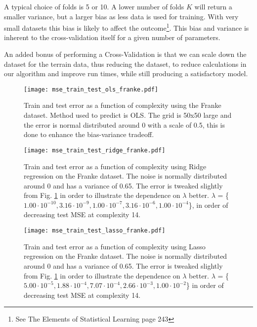 \documentclass[%
 reprint,
nofootinbib,
 amsmath,amssymb,
 aps,
]{revtex4-2}
\begin{document}
A typical choice of folds is 5 or 10. A lower number of folds $K$ will return a smaller variance, but a larger bias as less data is used for training. With very small datasets this bias is likely to affect the outcome\footnote{See The Elements of Statistical Learning\cite{Hastie} page 243}. This bias and variance is inherent to the cross-validation itself for a given number of parameters.

An added bonus of performing a Cross-Validation is that we can scale down the
dataset for the terrain data, thus reducing the dataset, to reduce calculations
in our algorithm and improve run times, while still producing a satisfactory model.

\begin{figure}[b]
\texttt{[image: mse\_train\_test\_ols\_franke.pdf]}
\caption{\label{fig:mse_train_test_ols_franke_eps05} Train and test error as a function of complexity using the Franke dataset. Method used to predict is OLS. The grid is 50x50 large and the error is normal distributed around 0 with a scale of 0.5, this is done to enhance the bias-variance tradeoff.}
\end{figure}

\begin{figure}[h!]
\texttt{[image: mse\_train\_test\_ridge\_franke.pdf]}
\caption{\label{fig:mse_train_test_ridge_franke_eps065} Train and test error as a function of complexity using Ridge regression on the Franke dataset. The noise is normally distributed around 0 and has a variance of 0.65. The error is tweaked slightly from Fig. \ref{fig:mse_train_test_ols_franke_eps05} in order to illustrate the dependence on $\lambda$ better. $\lambda$ = \{$1.00 \cdot 10^{-10}, 3.16 \cdot 10^{-9}, 1.00 \cdot 10^{-7}, 3.16 \cdot 10^{-6}, 1.00 \cdot 10^{-4} $\}, in order of decreasing test MSE at complexity 14.}
\end{figure}

\begin{figure}[h!]
\texttt{[image: mse\_train\_test\_lasso\_franke.pdf]}
\caption{\label{fig:mse_train_test_lasso_franke_eps065} Train and test error as a function of complexity using Lasso regression on the Franke dataset. The noise is normally distributed around 0 and has a variance of 0.65. The error is tweaked slightly from Fig. \ref{fig:mse_train_test_ols_franke_eps05} in order to illustrate the dependence on $\lambda$ better. $\lambda$ = \{$5.00 \cdot 10^{-5}, 1.88 \cdot 10^{-4}, 7.07 \cdot 10^{-4}, 2.66 \cdot 10^{-3}, 1.00 \cdot 10^{-2} $\} in order of decreasing test MSE at complexity 14.}
\end{figure}
\end{document}
